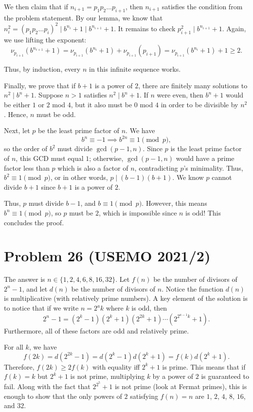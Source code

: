 \documentclass{scrartcl}
\begin{document}
We then claim that if $n_{i+1} = p_1p_2\ldots p_{i+1}$, then $n_{i+1}$ satisfies the condition from the problem statement.
By our lemma, we know that $n_i^2 = (p_1p_2\ldots p_i)^2 \mid b^{n_i} + 1 \mid b^{n_{i+1}} + 1$.
It remains to check $p_{i+1}^2 \mid b^{n_{i+1}} + 1$.
Again, we use lifting the exponent:
\[ \nu_{p_{i+1}}(b^{n_{i+1}} + 1) = \nu_{p_{i+1}}(b^{n_i} + 1) + \nu_{p_{i+1}}(p_{i+1}) = \nu_{p_{i+1}}(b^{n_i} + 1) + 1 \geq 2. \]

Thus, by induction, every $n$ in this infinite sequence works.

Finally, we prove that if $b+1$ is a power of $2$, there are finitely many solutions to $n^2 \mid b^n + 1$.
Suppose $n > 1$ satisfies $n^2 \mid b^n + 1$.
If $n$ were even, then $b^n + 1$ would be either $1$ or $2$ mod $4$, but it also must be $0$ mod $4$ in order to be divisible by $n^2$.
Hence, $n$ must be odd.

Next, let $p$ be the least prime factor of $n$.
We have
\[ b^n \equiv -1 \implies b^{2n} \equiv 1 \pmod{p}, \]
so the order of $b^2$ must divide $\gcd(p-1,n)$.
Since $p$ is the least prime factor of $n$, this GCD must equal $1$; otherwise, $\gcd(p-1,n)$ would have a prime factor less than $p$ which is also a factor of $n$, contradicting $p$'s minimality.
Thus, $b^2 \equiv 1 \pmod{p}$, or in other words, $p \mid (b-1)(b+1)$.
We know $p$ cannot divide $b+1$ since $b+1$ is a power of $2$.

Thus, $p$ must divide $b-1$, and $b \equiv 1 \pmod{p}$.
However, this means $b^n \equiv 1 \pmod{p}$, so $p$ must be $2$, which is impossible since $n$ is odd!
This concludes the proof.

\section*{Problem 26 (USEMO 2021/2)}
The answer is $n \in \{1,2,4,6,8,16,32\}$.
Let $f(n)$ be the number of divisors of $2^n - 1$, and let $d(n)$ be the number of divisors of $n$.
Notice the function $d(n)$ is multiplicative (with relatively prime numbers).
A key element of the solution is to notice that if we write $n = 2^ak$ where $k$ is odd, then
\[ 2^n - 1 = (2^k - 1)(2^k + 1)(2^{2k} + 1)\cdots (2^{2^{a-1}k} + 1). \]
Furthermore, all of these factors are odd and relatively prime.

For all $k$, we have
\[ f(2k) = d(2^{2k} - 1) = d(2^k - 1)d(2^k + 1) = f(k)d(2^k + 1). \]
Therefore, $f(2k) \geq 2f(k)$ with equality iff $2^k + 1$ is prime.
This means that if $f(k) = k$ but $2^k + 1$ is not prime, multiplying $k$ by a power of $2$ is guaranteed to fail.
Along with the fact that $2^{2^5} + 1$ is not prime (look at Fermat primes), this is enough to show that the only powers of $2$ satisfying $f(n) = n$ are $1$, $2$, $4$, $8$, $16$, and $32$.
\end{document}
